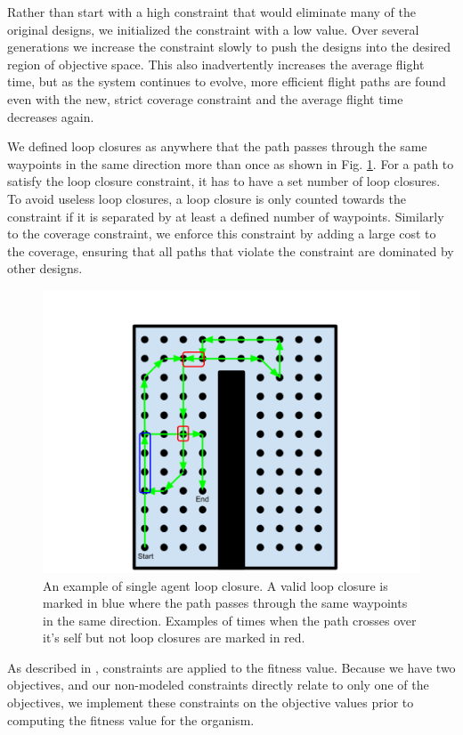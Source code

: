 \documentclass[letterpaper, 10 pt, conference]{ieeeconf}  %
\begin{document}
Rather than start with a high constraint that would eliminate many of the original designs, we initialized the constraint with a low value. Over several generations we increase the constraint slowly to push the designs into the desired region of objective space. This also inadvertently increases the average flight time, but as the system continues to evolve, more efficient flight paths are found even with the new, strict coverage constraint and the average flight time decreases again.

We defined loop closures as anywhere that the path passes through the same waypoints in the same direction more than once as shown in Fig. \ref{fig:loop_closure}. For a path to satisfy the loop closure constraint, it has to have a set number of loop closures. To avoid useless loop closures, a loop closure is only counted towards the constraint if it is separated by at least a defined number of waypoints. Similarly to the coverage constraint, we enforce this constraint by adding a large cost to the coverage, ensuring that all paths that violate the constraint are dominated by other designs.

\begin{figure}
\centering
\includegraphics[width=0.8\linewidth]{figures/loop_closure.png}
\caption{An example of single agent loop closure. A valid loop closure is marked in blue where the path passes through the same waypoints in the same direction. Examples of times when the path crosses over it's self but not loop closures are marked in red.}
\label{fig:loop_closure}
\end{figure}

As described in \cite{Parkinson2019}, constraints are applied to the fitness value. Because we have two objectives, and our non-modeled constraints directly relate to only one of the objectives, we implement these constraints on the objective values prior to computing the fitness value for the organism.
\end{document}
